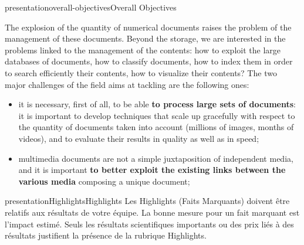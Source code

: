 \documentclass{ra2013}
\begin{document}
\begin{module}{presentation}{overall-objectives}{Overall Objectives}

  The explosion of the quantity of numerical documents raises the problem
  of the management of these documents. Beyond the storage,
  we are interested in the problems linked to the management of the contents: 
  how to exploit the large databases of documents, how to classify documents, how to
  index them in order to search efficiently their contents, how to visualize
  their contents? 
  The two major challenges of the field  aims at tackling are the following ones:
  \begin{itemize} 
  \item it is necessary, first of all, to be able {\bf to
      process large sets of documents}: it is important to develop techniques
    that scale up gracefully with respect to the quantity of documents
    taken into account (millions of images, months of videos), and to evaluate
    their results in quality as well as in speed;
    
  \item  multimedia documents are not a simple juxtaposition of
    independent media, and it is important {\bf to better exploit the
      existing links between the various media} composing a unique
    document;
  \end{itemize}
\end{module}

\begin{module}{presentation}{Highlights}{Highlights}
Les  Highlights (Faits Marquants) doivent être relatifs aux résultats de votre équipe. La bonne mesure pour un fait marquant est l'impact estimé. Seuls les résultats scientifiques importants ou des prix liés à des résultats justifient la présence de la rubrique Highlights.
\end{module}
\end{document}
